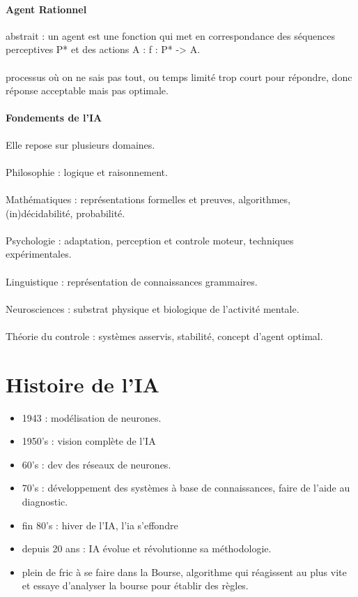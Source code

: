 \documentclass{article}
\begin{document}
\paragraph{Agent Rationnel} abstrait : un agent est une fonction qui met en correspondance des séquences perceptives P* et des actions A : f : P* -> A.\\\\processus où on ne sais pas tout, ou temps limité trop court pour répondre, donc réponse acceptable mais pas optimale.
\paragraph{Fondements de l'IA}Elle repose sur plusieurs domaines.\\\\Philosophie : logique et raisonnement.\\\\Mathématiques : représentations formelles et preuves, algorithmes, (in)décidabilité, probabilité.\\\\Psychologie : adaptation, perception et controle moteur, techniques expérimentales.\\\\Linguistique : représentation de connaissances grammaires.\\\\Neurosciences : substrat physique et biologique de l'activité mentale.\\\\Théorie du controle : systèmes asservis, stabilité, concept d'agent optimal.

\section{Histoire de l'IA}\begin{itemize}
\item 1943 : modélisation de neurones.
\item 1950's : vision complète de l'IA
\item 60's : dev des réseaux de neurones.
\item 70's : développement des systèmes à base de connaissances, faire de l'aide au diagnostic.
\item fin 80's : hiver de l'IA, l'ia s’effondre
\item depuis 20 ans : IA évolue et révolutionne sa méthodologie.
\item plein de fric à se faire dans la Bourse, algorithme qui réagissent au plus vite et essaye d'analyser la bourse pour établir des règles. 
\end{itemize}
\end{document}
